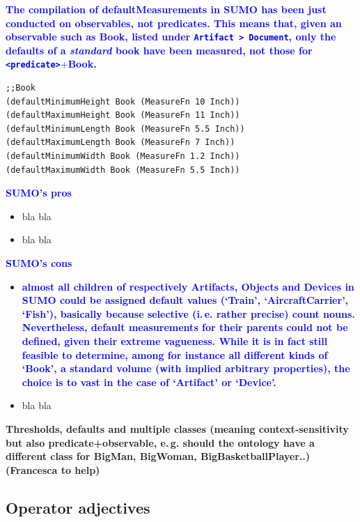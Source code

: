 \documentclass[11pt]{article}
\newcommand{\done}{\item[\checkmark]}
\newcommand{\crossed}{\item[$\times$]}
\begin{document}
\textbf{\textcolor{blue}{The compilation of defaultMeasurements in SUMO has been just conducted on observables, not predicates. This means that, given an observable such as Book, listed under \texttt{Artifact > Document}, only the defaults of a \textit{standard} book have been measured, not those for \texttt{<predicate>$+$}Book.}}

\begin{verbatim}
;;Book
(defaultMinimumHeight Book (MeasureFn 10 Inch))
(defaultMaximumHeight Book (MeasureFn 11 Inch))
(defaultMinimumLength Book (MeasureFn 5.5 Inch))
(defaultMaximumLength Book (MeasureFn 7 Inch))
(defaultMinimumWidth Book (MeasureFn 1.2 Inch))
(defaultMaximumWidth Book (MeasureFn 5.5 Inch))
\end{verbatim}

\textbf{\textcolor{blue}{SUMO's pros}}
\begin{itemize}[label=$\bar$]
\done bla bla
\done bla bla 
\end{itemize}




\textbf{\textcolor{blue}{SUMO's cons}}
\begin{itemize}
\crossed \textbf{\textcolor{blue}{almost all children of respectively Artifacts, Objects and Devices in SUMO could be assigned default values (`Train', `AircraftCarrier', `Fish'), basically because selective (i.\,e. rather precise) count nouns. Nevertheless, default measurements for their parents could not be defined, given their extreme vagueness. While it is in fact still feasible to determine, among for instance all different kinds of `Book', a standard volume (with implied arbitrary properties), the choice is to vast in the case of `Artifact' or `Device'.}}

\crossed bla bla 
\end{itemize}


\textbf{Thresholds, defaults and multiple classes (meaning context-sensitivity but also predicate+observable, e.\,g. should the ontology have a different class for BigMan, BigWoman, BigBasketballPlayer..) (Francesca to help)}

\subsection{Operator adjectives}
\end{document}
